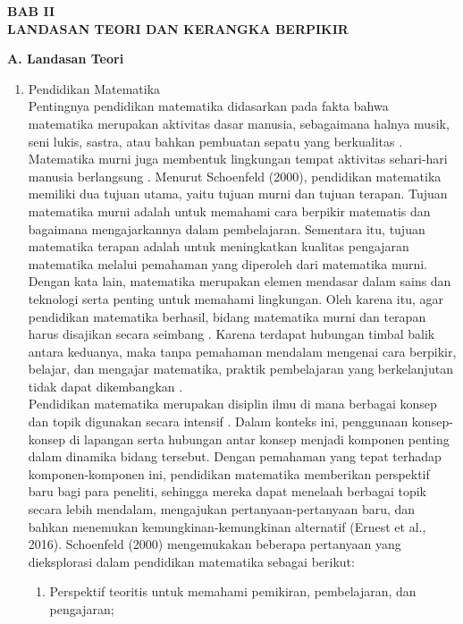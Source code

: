 \documentclass[12pt]{article}
\begin{document}
\begin{center}
    \textbf{BAB II}\\
    \textbf{LANDASAN TEORI DAN KERANGKA BERPIKIR}
\end{center}

\textbf{A. Landasan Teori}
\begin{enumerate}
    \item Pendidikan Matematika\\
    \hspace*{1cm}Pentingnya pendidikan matematika didasarkan pada fakta bahwa matematika merupakan aktivitas dasar manusia, sebagaimana halnya musik, seni lukis, sastra, atau bahkan pembuatan sepatu yang berkualitas \citep{hilton1984}. Matematika murni juga membentuk lingkungan tempat aktivitas sehari-hari manusia berlangsung \citep{yig2022}. Menurut Schoenfeld (2000), pendidikan matematika memiliki dua tujuan utama, yaitu tujuan murni dan tujuan terapan. Tujuan matematika murni adalah untuk memahami cara berpikir matematis dan bagaimana mengajarkannya dalam pembelajaran. Sementara itu, tujuan matematika terapan adalah untuk meningkatkan kualitas pengajaran matematika melalui pemahaman yang diperoleh dari matematika murni. Dengan kata lain, matematika merupakan elemen mendasar dalam sains dan teknologi serta penting untuk memahami lingkungan. Oleh karena itu, agar pendidikan matematika berhasil, bidang matematika murni dan terapan harus disajikan secara seimbang \citep{hilton1984}. Karena terdapat hubungan timbal balik antara keduanya, maka tanpa pemahaman mendalam mengenai cara berpikir, belajar, dan mengajar matematika, praktik pembelajaran yang berkelanjutan tidak dapat dikembangkan \citep{schoenfeld2000}.\\
    \hspace*{1cm}Pendidikan matematika merupakan disiplin ilmu di mana berbagai konsep dan topik digunakan secara intensif \citep{turkdogan2015}. Dalam konteks ini, penggunaan konsep-konsep di lapangan serta hubungan antar konsep menjadi komponen penting dalam dinamika bidang tersebut. Dengan pemahaman yang tepat terhadap komponen-komponen ini, pendidikan matematika memberikan perspektif baru bagi para peneliti, sehingga mereka dapat menelaah berbagai topik secara lebih mendalam, mengajukan pertanyaan-pertanyaan baru, dan bahkan menemukan kemungkinan-kemungkinan alternatif (Ernest et al., 2016). Schoenfeld (2000) mengemukakan beberapa pertanyaan yang dieksplorasi dalam pendidikan matematika sebagai berikut:
    \begin{enumerate}
        \item Perspektif teoritis untuk memahami pemikiran, pembelajaran, dan pengajaran;

\end{enumerate}
\end{enumerate}
\end{document}
